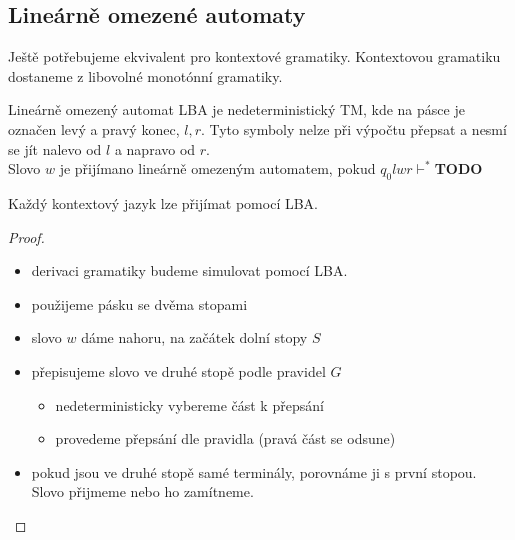 \documentclass[../main.tex]{subfiles}
\begin{document}
\subsection{Lineárně omezené automaty}
Ještě potřebujeme ekvivalent pro kontextové gramatiky. Kontextovou gramatiku dostaneme z libovolné monotónní gramatiky.
\begin{definition}
    Lineárně omezený automat LBA je nedeterministický TM, kde na pásce je označen levý a pravý konec, $l,r$. Tyto symboly nelze
    při výpočtu přepsat a nesmí se jít nalevo od $l$ a napravo od $r$.\\
    Slovo $w$ je přijímano lineárně omezeným automatem, pokud $q_0 l w r \vdash^*$\textbf{TODO}
\end{definition}
\begin{theorem}
    Každý kontextový jazyk lze přijímat pomocí LBA.
    \begin{proof}
        \begin{itemize}
            \item derivaci gramatiky budeme simulovat pomocí LBA.
            \item použijeme pásku se dvěma stopami
            \item slovo $w$ dáme nahoru, na začátek dolní stopy $S$
            \item přepisujeme slovo ve druhé stopě podle pravidel $G$
            \begin{itemize}
                \item nedeterministicky vybereme část k přepsání
                \item provedeme přepsání dle pravidla (pravá část se odsune)
            \end{itemize}
            \item pokud jsou ve druhé stopě samé terminály, porovnáme ji s první stopou. Slovo přijmeme nebo ho zamítneme.
        \end{itemize}
    \end{proof}
\end{theorem}
\end{document}
